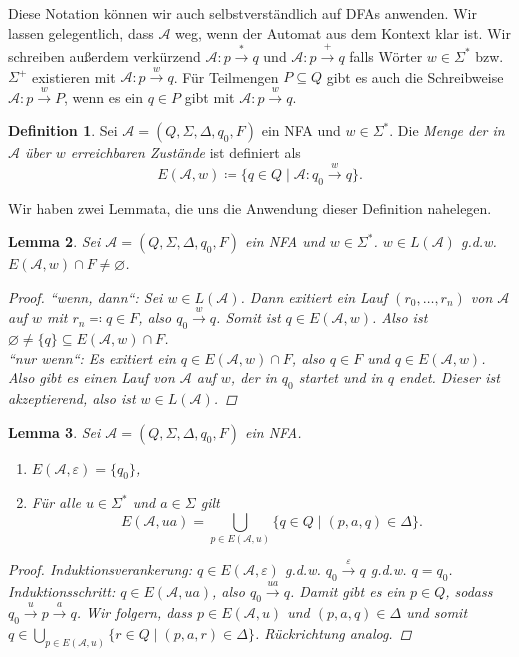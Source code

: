 \documentclass[11pt, a4paper]{article}
\theoremstyle{definition}
\newtheorem{definition}{Definition}[section]
\theoremstyle{plain}
\newtheorem{lemma}[definition]{Lemma}
\numberwithin{equation}{section}
\newcommand{\reaches}{\xrightarrow}
\let\emptyset\varnothing
\begin{document}
Diese Notation können wir auch selbstverständlich auf DFAs anwenden. Wir lassen gelegentlich, dass $\mathcal{A}$ weg, wenn der Automat aus dem Kontext klar ist. Wir schreiben außerdem verkürzend $\mathcal{A}: p \reaches{\ast} q$ und $\mathcal{A}: p \reaches{+} q$ falls Wörter $w \in \Sigma^\ast$ bzw. $\Sigma^+$ existieren mit $\mathcal{A}: p \reaches{w} q$. Für Teilmengen $P \subseteq Q$ gibt es auch die Schreibweise $\mathcal{A}: p \reaches{w} P$, wenn es ein $q \in P$ gibt mit $\mathcal{A}: p \reaches{w} q$.
\begin{definition}
	Sei $\mathcal{A} = (Q, \Sigma, \Delta, q_0, F)$ ein NFA und $w \in \Sigma^\ast$. Die \textit{Menge der in $\mathcal{A}$ über $w$ erreichbaren Zustände} ist definiert als
	$$
		E(\mathcal{A}, w) \coloneqq \{ q \in Q \mid \mathcal{A}: q_0 \reaches{w} q \}.
	$$
\end{definition}
Wir haben zwei Lemmata, die uns die Anwendung dieser Definition nahelegen.
\begin{lemma}\label{lem:reach1}
	Sei $\mathcal{A} = (Q, \Sigma, \Delta, q_0, F)$ ein NFA und $w \in \Sigma^\ast$. $w \in L(\mathcal{A})$ {g.d.w.} $E(\mathcal{A}, w) \cap F \neq \emptyset$.
	\begin{proof}
		``wenn, dann``: Sei $w \in L(\mathcal{A})$. Dann exitiert ein Lauf $(r_0, \ldots, r_n)$ von $\mathcal{A}$ auf $w$ mit $r_n \eqqcolon q \in F$, also $q_0 \reaches{w} q$. Somit ist $q \in E(\mathcal{A}, w)$. Also ist $\emptyset \neq \{q\} \subseteq E(\mathcal{A}, w) \cap F$.\\
		``nur wenn``: Es exitiert ein $q \in E(\mathcal{A}, w) \cap F$, also $q \in F$ und $q \in E(\mathcal{A}, w)$. Also gibt es einen Lauf von $\mathcal{A}$ auf $w$, der in $q_0$ startet und in $q$ endet. Dieser ist akzeptierend, also ist $w \in L(\mathcal{A})$.
	\end{proof}
\end{lemma}
\begin{lemma}\label{lem:reach2}
	Sei $\mathcal{A} = (Q, \Sigma, \Delta, q_0, F)$ ein NFA.
	\begin{enumerate}
		\item $E(\mathcal{A}, \varepsilon) = \{q_0\}$,
		\item Für alle $u \in \Sigma^\ast$ und $a \in \Sigma$ gilt
			$$
				E(\mathcal{A}, ua) = \bigcup_{p \in E(\mathcal{A}, u)} \{ q \in Q \mid (p, a, q) \in \Delta \}.
			$$
	\end{enumerate}
	\begin{proof}
		Induktionsverankerung: $q \in E(\mathcal{A}, \varepsilon)$ {g.d.w.} $q_0 \reaches{\varepsilon} q$ {g.d.w.} $q = q_0$. \checkmark\\
		Induktionsschritt: $q \in E(\mathcal{A}, ua)$, also $q_0 \reaches{ua} q$. Damit gibt es ein $p \in Q$, sodass $q_0 \reaches{u} p \reaches{a} q$. Wir folgern, dass $p \in E(\mathcal{A}, u)$ und $(p, a, q) \in \Delta$ und somit $q \in \bigcup_{p \in E(\mathcal{A}, u)} \{ r \in Q \mid (p, a, r) \in \Delta \}$. Rückrichtung analog.
	\end{proof}
\end{lemma}
\end{document}
